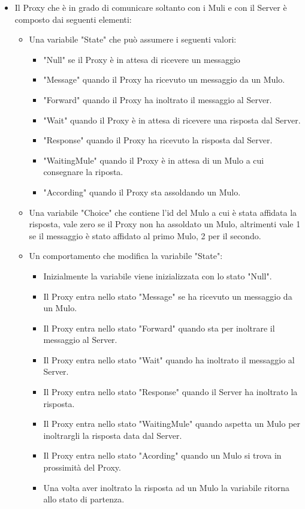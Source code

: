 \documentclass[13pt,a4paper]{article}
\begin{document}
\begin{itemize}
	
	\item Il Proxy che è in grado di comunicare soltanto con i Muli e con il Server è composto dai seguenti elementi: 
	\begin{itemize}
		\item Una variabile "State" che può assumere i seguenti valori:
		\begin{itemize}
			\item "Null" se il Proxy è in attesa di ricevere un messaggio
			\item "Message" quando il Proxy ha ricevuto un messaggio da un Mulo.
			\item "Forward" quando il Proxy ha inoltrato il messaggio al Server.
			\item "Wait" quando il Proxy è in attesa di ricevere una risposta dal Server.
			\item "Response" quando il Proxy ha ricevuto la risposta dal Server.
			\item "WaitingMule" quando il Proxy è in attesa di un Mulo a cui consegnare la riposta. 
			\item "According" quando il Proxy sta assoldando un Mulo.
		\end{itemize}
		\item Una variabile "Choice" che contiene l'id del Mulo a cui è stata affidata la risposta, vale zero se il Proxy non ha assoldato un Mulo, altrimenti vale 1 se il messaggio è stato affidato al primo Mulo, 2 per il secondo.
		\item Un comportamento che modifica la variabile "State":
		\begin{itemize}
			\item Inizialmente la variabile viene inizializzata con lo stato "Null".
			\item Il Proxy entra nello stato "Message" se ha ricevuto un messaggio da un Mulo.
			\item Il Proxy entra nello stato "Forward" quando sta per inoltrare il messaggio al Server.
			\item Il Proxy entra nello stato "Wait" quando ha inoltrato il messaggio al Server.
			\item Il Proxy entra nello stato "Response" quando il Server ha inoltrato la risposta.
			\item Il Proxy entra nello stato "WaitingMule" quando aspetta un Mulo per inoltrargli la risposta data dal Server.
			\item Il Proxy entra nello stato "Acording" quando un Mulo si trova in prossimità del Proxy.
			\item Una volta aver inoltrato la risposta ad un Mulo la variabile ritorna allo stato di partenza.

\end{itemize}
\end{itemize}
\end{itemize}
\end{document}
